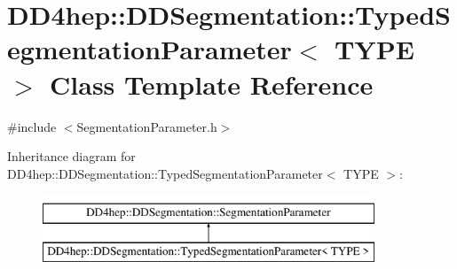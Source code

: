 \hypertarget{class_d_d4hep_1_1_d_d_segmentation_1_1_typed_segmentation_parameter}{}\section{D\+D4hep\+:\+:D\+D\+Segmentation\+:\+:Typed\+Segmentation\+Parameter$<$ T\+Y\+PE $>$ Class Template Reference}
\label{class_d_d4hep_1_1_d_d_segmentation_1_1_typed_segmentation_parameter}


{\ttfamily \#include $<$Segmentation\+Parameter.\+h$>$}

Inheritance diagram for D\+D4hep\+:\+:D\+D\+Segmentation\+:\+:Typed\+Segmentation\+Parameter$<$ T\+Y\+PE $>$\+:\begin{figure}[H]
\begin{center}
\leavevmode
\includegraphics[height=2.000000cm]{class_d_d4hep_1_1_d_d_segmentation_1_1_typed_segmentation_parameter}
\end{center}
\end{figure}
